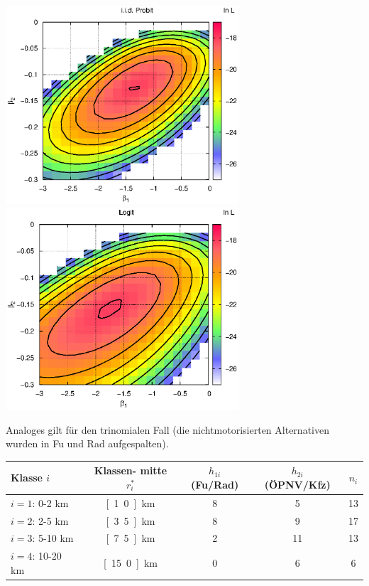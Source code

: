 \documentclass[a4paper]{foils}
\begin{document}
\begin{landscape}
\begin{center}
 \includegraphics[width=0.65\textwidth]{./figsDiscr/kalProbitTrinom_beta1beta2.eps}
 \includegraphics[width=0.65\textwidth]{./figsDiscr/kalLogitTrinom_beta1beta2.eps}   
\vspace{1em}

\parbox{1.1\textwidth}{Analoges gilt f\"ur den trinomialen Fall (die
  nichtmotorisierten Alternativen wurden in Fu\3 und Rad aufgespalten).
}



\newpage
\vspace{3em}
\begin{center}
\begin{tabular}{|l||c|c|c||c|} \hline
Klasse $i$ & 
\myBox{4em}{Klassen-\\mitte $r^*_i$} &
\myBox{4em}{ $h_{1i}$\\(Fu\3/Rad)} &
\myBox{5em}{ $h_{2i}$\\ (\"OPNV/Kfz)}  & $n_i$ \\
\hline\hline
$i=1$: 0-2 km  & \unit[1.0]{km} & 8 & 5 & 13 \\
$i=2$: 2-5 km  & \unit[3.5]{km} & 8 & 9 & 17\\
$i=3$: 5-10 km  & \unit[7.5]{km} & 2 & 11 & 13\\
$i=4$: 10-20 km  & \unit[15.0]{km} & 0 & 6 & 6 \\ \hline
\end{tabular}
\end{center}
\vspace{3em}


\end{center}
\end{landscape}
\end{document}
